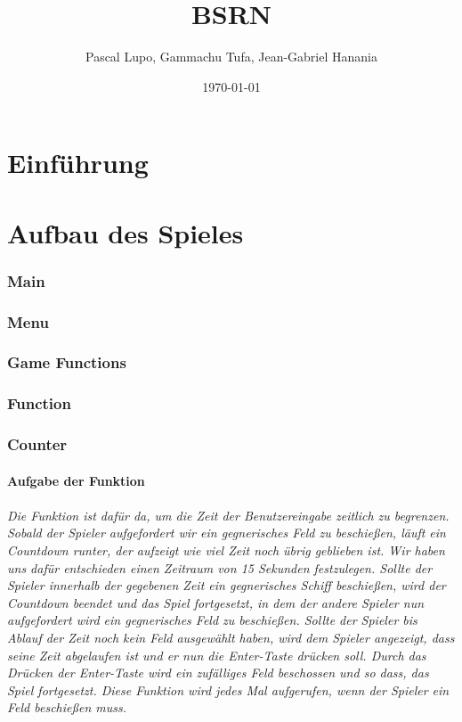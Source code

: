 \documentclass{article}
\title{BSRN}
\author{Pascal Lupo, Gammachu Tufa, Jean-Gabriel Hanania}
\date{\today}
\begin{document}
\maketitle
\tableofcontents



\newpage
\part{Einführung}
\part{Aufbau des Spieles}
\section{Main}
\section{Menu}
\section{Game Functions}
\section{Function}
\section{Counter}
\subsection{Aufgabe der Funktion}
\paragraph{Die Funktion ist dafür da, um die Zeit der Benutzereingabe zeitlich zu begrenzen. Sobald der Spieler aufgefordert wir ein gegnerisches Feld zu beschießen,  läuft ein Countdown runter, der aufzeigt wie viel Zeit noch übrig geblieben ist. Wir haben uns dafür entschieden einen Zeitraum von 15 Sekunden festzulegen. Sollte der Spieler innerhalb der gegebenen Zeit ein gegnerisches Schiff beschießen, wird der Countdown beendet und das Spiel fortgesetzt, in dem der andere Spieler nun aufgefordert wird ein gegnerisches Feld zu beschießen. Sollte der Spieler bis Ablauf der Zeit noch kein Feld ausgewählt haben, wird dem Spieler angezeigt, dass seine Zeit abgelaufen ist und er nun die Enter-Taste drücken soll. Durch das Drücken der Enter-Taste wird ein zufälliges Feld beschossen und so dass, das Spiel fortgesetzt.
Diese Funktion wird jedes Mal aufgerufen, wenn der Spieler ein Feld beschießen muss.}
\end{document}
